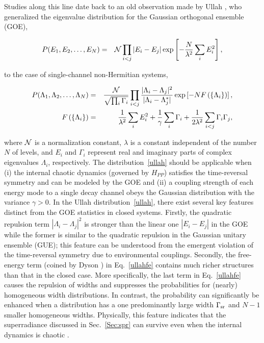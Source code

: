 \documentclass{tADP2e}
\theoremstyle{plain}
\newcommand{\eqn}[1]{
\begin{eqnarray}
	#1
\end{eqnarray}
}
\theoremstyle{plain}
\theoremstyle{definition}
\begin{document}
 Studies along this line date back to an old observation made by Ullah \cite{UN69}, who generalized the eigenvalue distribution for the Gaussian orthogonal ensemble (GOE),
\eqn{P(E_{1},E_{2},\ldots,E_{N}) & = & {\cal N}\prod_{i<j}|E_{i}-E_{j}|\exp\left[-\frac{N}{\lambda^{2}}\sum_{i}E_{i}^{2}\right],
}
to the case of single-channel non-Hermitian systems,
\eqn{P(\Lambda_{1},\Lambda_{2},\ldots,\Lambda_{N}) & = & \frac{{\cal N}}{\sqrt{\prod_{i}\Gamma_{i}}}\prod_{i<j}\frac{|\Lambda_{i}-\Lambda_{j}|^{2}}{|\Lambda_{i}-\Lambda_{j}^{*}|}\exp\left[-NF\left(\left\{ \Lambda_{i}\right\} \right)\right],\label{ullah}\\
F\left(\left\{ \Lambda_{i}\right\} \right) & = & \frac{1}{\lambda^{2}}\sum_{i}E_{i}^{2}+\frac{1}{\gamma}\sum_{i}\Gamma_{i}+\frac{1}{2\lambda^{2}}\sum_{i<j}\Gamma_{i}\Gamma_{j},\label{ullahfe}
} 
where  $\cal N$ is a normalization constant, $\lambda$ is a constant independent of the number $N$ of levels, and $E_i$ and $\Gamma_i$ represent real and imaginary parts of complex eigenvalues $\Lambda_i$, respectively. The distribution~\eqref{ullah} should be applicable when (i) the internal chaotic dynamics (governed by $H_{PP}$) satisfies the time-reversal symmetry and can be modeled by the GOE and (ii) a coupling strength of each energy mode to a single decay channel obeys the Gaussian distribution with the variance $\gamma>0$. In the Ullah distribution~\eqref{ullah}, there exist several key features distinct from the GOE statistics in closed systems. Firstly, the quadratic repulsion term $|\Lambda_i-\Lambda_j|^2$ is stronger than the linear one $|E_i-E_j|$ in the GOE while the former is similar to the quadratic repulsion in the Gaussian   unitary ensemble (GUE); this feature can be understood from the emergent violation of the time-reversal symmetry due to environmental couplings. Secondly, the free-energy term (coined by Dyson \cite{DFJ62}) in Eq.~\eqref{ullahfe} contains much richer structures  than that in the closed case. More specifically, the last term in Eq.~\eqref{ullahfe} causes the repulsion of widths and suppresses  the probabilities for (nearly) homogeneous width distributions. In contrast, the probability can significantly be enhanced when a distribution has a one predominantly large width $\Gamma_{\rm sr}$ and $N-1$ smaller homogeneous widths. Physically, this feature indicates that the superradiance discussed in Sec.~\ref{Sec:spr} can survive even when the internal dynamics is chaotic \cite{VVS88,VVS89}. 
\end{document}
